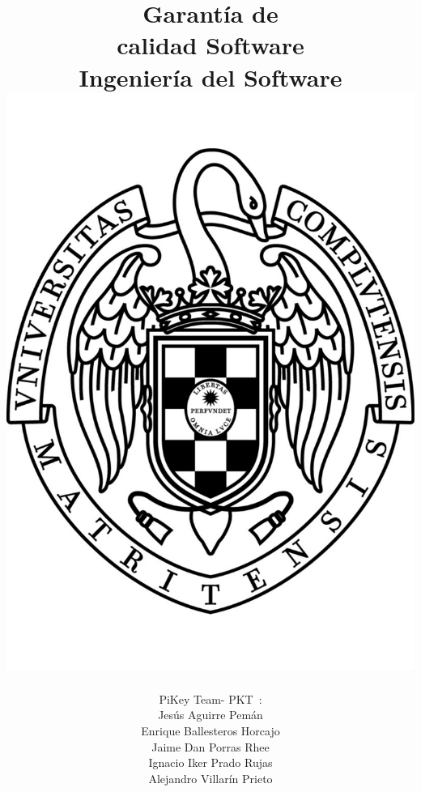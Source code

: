 \documentclass[spanish,a4paper,11pt, twoside]{report}	%
\newcommand*{\PKT}{\hbox{P}\kern-2.5pt\lower3.5pt\hbox{\small{K}}\kern-2.8pt\hbox{T}\kern-2pt}	%
\begin{document}
\renewcommand{\chaptername}{Parte}			%
\renewcommand{\thechapter}{\Roman{chapter}}	%

\title{\textbf{\huge{Garantía de \\ 
	calidad Software}} \\ \vspace{0.3cm}
	\Large{Ingeniería del Software} \\
	\includegraphics[scale=0.3]{ucm.pdf}}
\author{{\Large{PiKey Team-}} \PKT \ : \vspace{0.2cm} \\
	Jesús Aguirre Pemán \\
	 Enrique Ballesteros Horcajo \\
	 Jaime Dan Porras Rhee \\
	 Ignacio Iker Prado Rujas \\
	 Alejandro Villarín Prieto }
\date{\Today}
\maketitle
\end{document}
